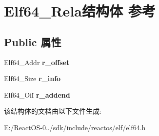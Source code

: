 \hypertarget{struct_elf64___rela}{}\section{Elf64\+\_\+\+Rela结构体 参考}
\label{struct_elf64___rela}
\subsection*{Public 属性}
\begin{DoxyCompactItemize}
\item 
\mbox{\label{struct_elf64___rela_a9ea7e07ec6e0d57bf4bcd53b89de7948}} 
Elf64\+\_\+\+Addr {\bfseries r\+\_\+offset}
\item 
\mbox{\label{struct_elf64___rela_ad4dfd140dea6dd28fe1bbbbcda5cfbb1}} 
Elf64\+\_\+\+Size {\bfseries r\+\_\+info}
\item 
\mbox{\label{struct_elf64___rela_ad155f32d5bf1f37013d2e43329511d52}} 
Elf64\+\_\+\+Off {\bfseries r\+\_\+addend}
\end{DoxyCompactItemize}


该结构体的文档由以下文件生成\+:\begin{DoxyCompactItemize}
\item 
E\+:/\+React\+O\+S-\/0../sdk/include/reactos/elf/elf64.\+h\end{DoxyCompactItemize}
